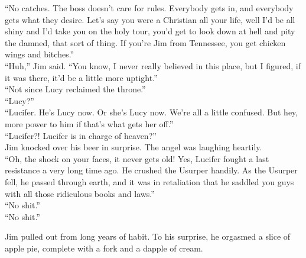 \enquote{No catches.  The boss doesn't care for rules.  Everybody gets in, and everybody gets what they desire.  Let's say you were a Christian all your life, well I'd be all shiny and I'd take you on the holy tour, you'd get to look down at hell and pity the damned, that sort of thing.  If you're Jim from Tennessee, you get chicken wings and bitches.}\\



\enquote{Huh,} Jim said.  \enquote{You know, I never really believed in this place, but I figured, if it was there, it'd be a little more uptight.}\\



\enquote{Not since Lucy reclaimed the throne.}\\



\enquote{Lucy?}\\



\enquote{Lucifer.  He's Lucy now.  Or she's Lucy now.  We're all a little confused.  But hey, more power to him if that's what gets her off.}\\



\enquote{Lucifer?!  Lucifer is in charge of heaven?}\\



Jim knocked over his beer in surprise.  The angel was laughing heartily.  \\



\enquote{Oh, the shock on your faces, it never gets old!  Yes, Lucifer fought a last resistance a very long time ago.  He crushed the Usurper handily.  As the Usurper fell, he passed through earth, and it was in retaliation that he saddled you guys with all those ridiculous books and laws.}\\



\enquote{No shit.}\\



\enquote{No shit.}\\

\asterism

Jim pulled out from long years of habit.  To his surprise, he orgasmed a slice of apple pie, complete with a fork and a dapple of cream.\\



